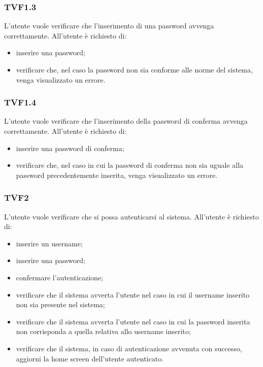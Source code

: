 		\subsubsection{TVF1.3}
			L'utente vuole verificare che l'inserimento di una password avvenga correttamente. All'utente è richiesto di:
			\begin{itemize}
				\item inserire una password;
				\item verificare che, nel caso la password non sia conforme alle norme del sistema, venga visualizzato un errore.
			\end{itemize}
			
		\subsubsection{TVF1.4}
			L'utente vuole verificare che l'inserimento della password di conferma avvenga correttamente. All'utente è richiesto di:
			\begin{itemize}
				\item inserire una password di conferma;
				\item verificare che, nel caso in cui la password di conferma non sia uguale alla password precedentemente inserita, venga visualizzato un errore.
			\end{itemize}
			
		\subsubsection{TVF2}
			L'utente vuole verificare che si possa autenticarsi al sistema. All'utente è richiesto di:
			\begin{itemize}
				\item inserire un username;
				\item inserire una password;
				\item confermare l'autenticazione;
				\item verificare che il sistema avverta l'utente nel caso in cui il username inserito non sia presente nel sistema;
				\item verificare che il sistema avverta l'utente nel caso in cui la password inserita non corrisponda a quella relativa allo username inserito;
				\item verificare che il sistema, in caso di autenticazione avvenuta con successo, aggiorni la home screen dell'utente autenticato.
			\end{itemize}
			
